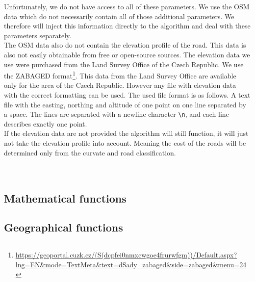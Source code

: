             Unfortunately, we do not have access to all of these parameters. We use the OSM data which do not necessarily contain all of those additional parameters. We therefore will inject this information directly to the algorithm and deal with these parameters separately.\\
            The OSM data also do not contain the elevation profile of the road. This data is also not easily obtainable from free or open-source sources. The elevation data we use were purchased from the Land Survey Office of the Czech Republic. We use the ZABAGED format\footnote{\url{https://geoportal.cuzk.cz/(S(dcpfei0nmxcwgoe4frurwfgm))/Default.aspx?lng=EN&mode=TextMeta&text=dSady_zabaged&side=zabaged&menu=24}}. This data from the Land Survey Office are available only for the area of the Czech Republic. However any file with elevation data with the correct formatting can be used. The used file format is as follows. A text file with the easting, northing and altitude of one point on one line separated by a space. The lines are separated with a newline character \texttt{\textbackslash n}, and each line describes exactly one point.\\
            If the elevation data are not provided the algorithm will still function, it will just not take the elevation profile into account. Meaning the cost of the roads will be determined only from the curvate and road classification.\\\\
        \\


    \subsection{Mathematical functions}

    \subsection{Geographical functions}
    \label{sec:geo_func}